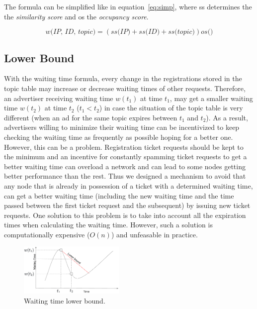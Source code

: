 The formula can be simplified like in equation~\ref{eq:simp}, where ss determines the the \emph{similarity score} and os the \emph{occupancy score}.

\begin{equation}
\label{eq:simp}
    \textit{w(IP, ID, topic)} = 
    (\textit{ss(IP)} + 
    \textit{ss(ID)} + 
    \textit{ss(topic)})
    \textit{os()}
\end{equation}

\subsection{Lower Bound}
With the waiting time formula, every change in the registrations stored in  the topic table may increase or decrease waiting times of other requests. 
Therefore,  an advertiser receiving waiting time $w(t_1)$ at time $t_1$, may get a smaller waiting time $w(t_2)$ at time $t_2$ ($t_1 < t_2$) in case the situation of the topic table is very different (\eg when an ad for the same topic expires between $t_1$ and $t_2$). 
As a result,  advertisers willing to minimize their waiting time can be incentivized to keep checking the waiting time as frequently as possible hoping for a better one.
However, this can be a problem. 
Registration ticket requests should be kept to the minimum and an incentive for constantly spamming ticket requests to get a better waiting time can overload a network and can lead to some nodes getting better performance than the rest.
Thus we designed a mechanism to avoid that any node that is already in possession of a ticket with a determined waiting time,   can get a better waiting time (including the new waiting time and the time passed between the first ticket request and the subsequent) by issuing new ticket requests.
One solution to this problem is to take into account all the expiration times when calculating the waiting time. 
However, such a solution is computationally expensive (\eg $O(n)$) and unfeasable in practice.

\begin{figure}
    \includegraphics[width=0.45\textwidth]{img/lower_bound.png}
    \caption{Waiting time lower bound.}
    \label{fig:lower_bound}
\end{figure}

